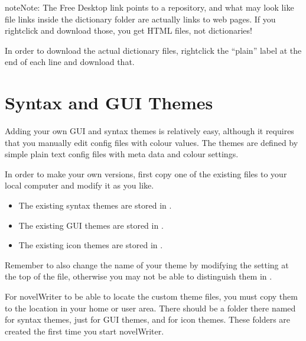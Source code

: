 \documentclass[a4paper,11pt,english]{sphinxmanual}
\begin{document}
\begin{sphinxadmonition}{note}{Note:}
\sphinxAtStartPar
The Free Desktop link points to a repository, and what may look like file links inside the
dictionary folder are actually links to web pages. If you right\sphinxhyphen{}click and download those, you
get HTML files, not dictionaries!

\sphinxAtStartPar
In order to download the actual dictionary files, right\sphinxhyphen{}click the “plain” label at the end of
each line and download that.
\end{sphinxadmonition}


\section{Syntax and GUI Themes}
\label{\detokenize{more_customise:syntax-and-gui-themes}}\label{\detokenize{more_customise:a-custom-theme}}
\sphinxAtStartPar
Adding your own GUI and syntax themes is relatively easy, although it requires that you manually
edit config files with colour values. The themes are defined by simple plain text config files with
meta data and colour settings.

\sphinxAtStartPar
In order to make your own versions, first copy one of the existing files to your local computer and
modify it as you like.
\begin{itemize}
\item {} 
\sphinxAtStartPar
The existing syntax themes are stored in
.

\item {} 
\sphinxAtStartPar
The existing GUI themes are stored in
.

\item {} 
\sphinxAtStartPar
The existing icon themes are stored in
.

\end{itemize}

\sphinxAtStartPar
Remember to also change the name of your theme by modifying the  setting at the top of the
file, otherwise you may not be able to distinguish them in .

\sphinxAtStartPar
For novelWriter to be able to locate the custom theme files, you must copy them to the
{\hyperref[\detokenize{tech_locations:a-locations-data}]{}} location in your home or user area. There should be a folder there named
 for syntax themes, just  for GUI themes, and  for icon themes. These
folders are created the first time you start novelWriter.
\end{document}
